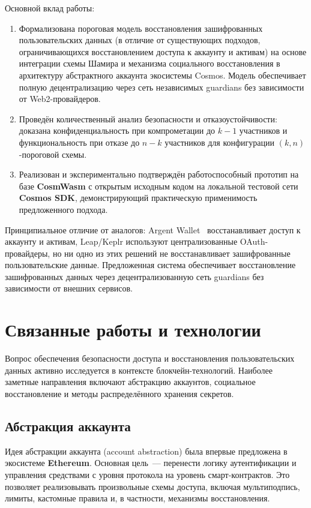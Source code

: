 Основной вклад работы:

\begin{enumerate}
\item
Формализована пороговая модель восстановления зашифрованных пользовательских данных (в отличие от существующих подходов, ограничивающихся восстановлением доступа к аккаунту и активам) на основе интеграции схемы Шамира и механизма социального восстановления в архитектуру абстрактного аккаунта экосистемы Cosmos. Модель обеспечивает полную децентрализацию через сеть независимых guardians без зависимости от Web2-провайдеров.

\item
Проведён количественный анализ безопасности и отказоустойчивости: доказана конфиденциальность при компрометации до $k-1$ участников и функциональность при отказе до $n-k$ участников для конфигурации $(k,n)$-пороговой схемы.

\item
Реализован и экспериментально подтверждён работоспособный прототип на базе \textbf{CosmWasm} с открытым исходным кодом на локальной тестовой сети \textbf{Cosmos SDK}, демонстрирующий практическую применимость предложенного подхода.
\end{enumerate}

Принципиальное отличие от аналогов: Argent Wallet~\cite{s1} восстанавливает доступ к аккаунту и активам, Leap/Keplr используют централизованные OAuth-провайдеры, но ни одно из этих решений не восстанавливает зашифрованные пользовательские данные. Предложенная система обеспечивает восстановление зашифрованных данных через децентрализованную сеть guardians без зависимости от внешних сервисов.


\section{Связанные работы и технологии}

Вопрос обеспечения безопасности доступа и восстановления пользовательских данных активно исследуется в контексте блокчейн-технологий. Наиболее заметные направления включают абстракцию аккаунтов, социальное восстановление и методы распределённого хранения секретов.

\subsection{Абстракция аккаунта}

Идея абстракции аккаунта (account abstraction) была впервые предложена в экосистеме \textbf{Ethereum}. Основная цель~--- перенести логику аутентификации и управления средствами с уровня протокола на уровень смарт-контрактов. Это позволяет реализовывать произвольные схемы доступа, включая мультиподпись, лимиты, кастомные правила и, в частности, механизмы восстановления.

